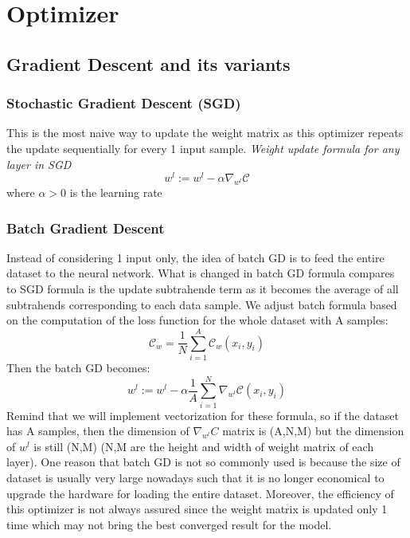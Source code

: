 \section{Optimizer}
\subsection{Gradient Descent and its variants}


\subsubsection{Stochastic Gradient Descent (SGD)}
This is the most naive way to update the weight matrix as this optimizer repeats the update sequentially for every 1 input sample.  
\textit{Weight update formula for any layer in SGD}
\begin{equation}
    w^{l} := w^{l} - \alpha \nabla_{w^{l}} \mathcal{C}
\end{equation}
where $\alpha > 0$ is the learning rate
\subsubsection{Batch Gradient Descent}
Instead of considering 1 input only, the idea of batch GD is to feed the entire dataset to the neural network. What is changed in batch GD formula compares to SGD formula is the update subtrahende term as it becomes the average of all subtrahends corresponding to each data sample. We adjust batch formula based on the computation of the loss function for the whole dataset with A samples:
\begin{equation}
    \mathcal{C}_{w} = \frac{1}{N} \sum^{A}_{i=1} \mathcal{C}_{w}(x_{i},y_{i})
\end{equation}
Then the batch GD becomes:
\begin{equation}
    w^{l} := w^{l} - \alpha \frac{1}{A} \sum^{N}_{i=1} \nabla_{w^{l}} \mathcal{C}(x_{i},y_{i})
\end{equation}
Remind that we will implement vectorization for these formula, so if the dataset has A samples, then the dimension of $\nabla_{w^{l}}C$ matrix is (A,N,M) but the dimension of $w^{l}$ is still (N,M) (N,M are the height and width of weight matrix of each layer).\newline\noindent
One reason that batch GD is not so commonly used is because the size of dataset is usually very large nowadays such that it is no longer economical to upgrade the hardware for loading the entire dataset. Moreover, the efficiency of this optimizer is not always assured since the weight matrix is updated only 1 time which may not bring the best converged result for the model.
